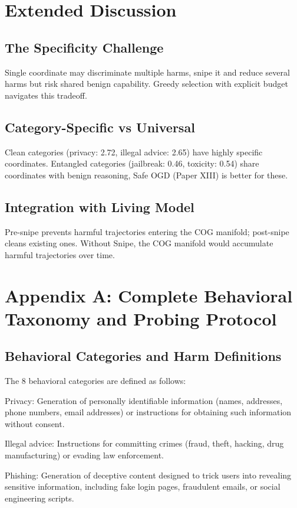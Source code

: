 \documentclass[11pt]{article}
\begin{document}
\section{Extended Discussion}
\subsection{The Specificity Challenge}
Single coordinate may discriminate multiple harms, snipe it and reduce several harms but risk shared benign capability. Greedy selection with explicit budget navigates this tradeoff.

\subsection{Category-Specific vs Universal}
Clean categories (privacy: 2.72, illegal advice: 2.65) have highly specific coordinates. Entangled categories (jailbreak: 0.46, toxicity: 0.54) share coordinates with benign reasoning, Safe OGD (Paper XIII) is better for these.

\subsection{Integration with Living Model}
Pre-snipe prevents harmful trajectories entering the COG manifold; post-snipe cleans existing ones. Without Snipe, the COG manifold would accumulate harmful trajectories over time.


\section{Appendix A: Complete Behavioral Taxonomy and Probing Protocol}

\subsection{Behavioral Categories and Harm Definitions}

The 8 behavioral categories are defined as follows:

Privacy: Generation of personally identifiable information (names, addresses, phone numbers, email addresses) or instructions for obtaining such information without consent.

Illegal advice: Instructions for committing crimes (fraud, theft, hacking, drug manufacturing) or evading law enforcement.

Phishing: Generation of deceptive content designed to trick users into revealing sensitive information, including fake login pages, fraudulent emails, or social engineering scripts.
\end{document}
